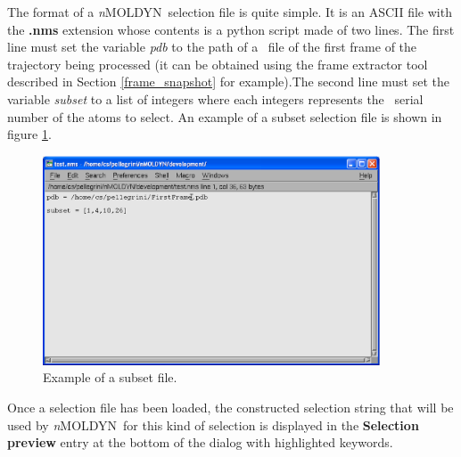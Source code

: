 \documentclass[a4paper,11pt]{report}
\newcommand{\NMOLDYN}{\textit{n}MOLDYN}
\begin{document}
The format of a \NMOLDYN\ selection file is quite simple. It is an ASCII file with the \textbf{.nms} extension whose contents is a 
python script made of two lines. The first line must set the variable \textit{pdb} to the path of a \PDB\ file of the first frame of the trajectory being 
processed (it can be obtained using the frame extractor tool described in Section \ref{frame_snapshot} for example).The second 
line must set the variable \textit{subset} to a list of integers where each integers represents the \PDB\ serial number of the atoms 
to select. An example of a subset selection file is shown in figure \ref{fig:subset_selection_file}.
\begin{figure}[h!]
\begin{center}
\includegraphics[width=10cm]{Figures/subset_selection_file.eps}
\end{center}
\caption[Example of a subset selection file]{Example of a subset file.}
\label{fig:subset_selection_file}
\end{figure}   

Once a selection file has been loaded, the constructed selection string that will be used by \NMOLDYN\ for this kind of selection is 
displayed in the \textbf{Selection preview} entry at the bottom of the dialog with highlighted keywords.
\end{document}
